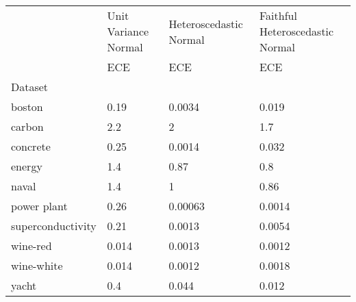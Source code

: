 \begin{tabular}{l|l|l|l}
\toprule
 & Unit Variance Normal & Heteroscedastic Normal & Faithful Heteroscedastic Normal \\
 & ECE & ECE & ECE \\
Dataset &  &  &  \\
\midrule
boston & 0.19 & 0.0034 & 0.019 \\
carbon & 2.2 & 2 & 1.7 \\
concrete & 0.25 & 0.0014 & 0.032 \\
energy & 1.4 & 0.87 & 0.8 \\
naval & 1.4 & 1 & 0.86 \\
power plant & 0.26 & 0.00063 & 0.0014 \\
superconductivity & 0.21 & 0.0013 & 0.0054 \\
wine-red & 0.014 & 0.0013 & 0.0012 \\
wine-white & 0.014 & 0.0012 & 0.0018 \\
yacht & 0.4 & 0.044 & 0.012 \\
\bottomrule
\end{tabular}

